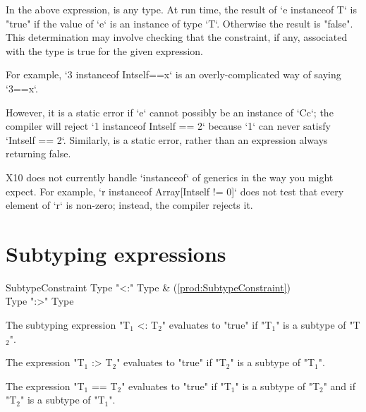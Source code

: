 In the above expression,  is any type. At run time, the
result of \xcd`e instanceof T`
is \xcd"true" if the
value of \xcd`e` is an instance of type \xcd`T`.
Otherwise the result is \xcd"false". This determination may involve checking
that the constraint, if any, associated with the type is true for the given
expression.

For example, \xcd`3 instanceof Int{self==x}` is an overly-complicated way of
saying \xcd`3==x`.


However, it is a static error if \xcd`e` cannot possibly be an instance of
\xcd`C{c}`; the compiler will reject \xcd`1 instanceof Int{self == 2}` because
\xcd`1` can never satisfy \xcd`Int{self == 2}`. Similarly,  is a static error, rather than an expression always returning false. 

\limitationx
X10 does not currently handle \xcd`instanceof` of generics in the way you
might expect.  For example, \xcd`r instanceof Array[Int{self != 0}]` does
not test that every element of \xcd`r` is non-zero; instead, the compiler
rejects it.


\section{Subtyping expressions}
\index{\Xcd{<:}}
\index{\Xcd{:>}}


\begin{bbgrammar}
   SubtypeConstraint \: Type  \xcd"<:" Type  & (\ref{prod:SubtypeConstraint}) \\
                    \| Type  \xcd":>" Type  \\
\end{bbgrammar}

The subtyping expression \xcdmath"T$_1$ <: T$_2$" evaluates to \xcd"true" if
\xcdmath"T$_1$" is a subtype of \xcdmath"T$_2$".

The expression \xcdmath"T$_1$ :> T$_2$" evaluates to \xcd"true" if
\xcdmath"T$_2$" is a subtype of \xcdmath"T$_1$".

The expression \xcdmath"T$_1$ == T$_2$"
evaluates to  \xcd"true" if 
\xcdmath"T$_1$" is a subtype of \xcdmath"T$_2$" and
if \xcdmath"T$_2$" is a subtype of \xcdmath"T$_1$".

